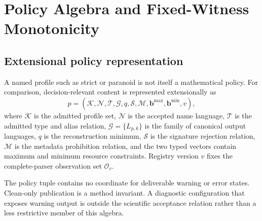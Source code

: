 \section{Policy Algebra and Fixed-Witness Monotonicity}
\label{sec:policy-algebra}

\subsection{Extensional policy representation}

A named profile such as strict or paranoid is not itself a mathematical policy.
For comparison, decision-relevant content is represented extensionally as
\begin{equation}
  p=(\mathcal{K},\mathcal{N},\mathcal{T},\mathcal{G},q,
  \mathcal{S},\mathcal{M},\mathbf{b}^{\max},\mathbf{b}^{\min},v),
  \label{eq:policy-tuple}
\end{equation}
where $\mathcal{K}$ is the admitted profile set, $\mathcal{N}$ is the accepted
name language, $\mathcal{T}$ is the admitted type and alias relation,
$\mathcal{G}=\{L_{p,k}\}$ is the family of canonical output languages, $q$ is
the reconstruction minimum, $\mathcal{S}$ is the signature rejection relation,
$\mathcal{M}$ is the metadata prohibition relation, and the two typed vectors
contain maximum and minimum resource constraints. Registry version $v$ fixes
the complete-parser observation set $\mathcal{O}_v$.

The policy tuple contains no coordinate for deliverable warning or error states.
Clean-only publication is a method invariant. A diagnostic configuration that
exposes warning output is outside the scientific acceptance relation rather
than a less restrictive member of this algebra.

